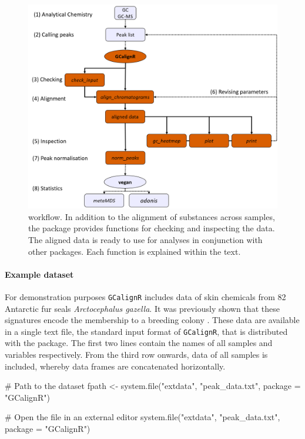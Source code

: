 \begin{figure}[htbp]
  \centering
  \includegraphics[width=13cm]{figures/workflow}
  \caption{ workflow. In addition to the alignment of substances across samples, the package provides functions for checking and inspecting the data. The aligned data is ready to use for analyses in conjunction with other packages. Each function is explained within the text.}
  \label{figure:workflow}
\end{figure}

\paragraph{Example dataset}\label{example-dataset}

For demonstration purposes \texttt{GCalignR} includes data of skin
chemicals from 82 Antarctic fur seals \textit{Arctocephalus gazella}. It
was previously shown that these signatures encode the membership to a
breeding colony \cite{Stoffel.2015}. These data are available in a
single text file, the standard input format of \texttt{GCalignR}, that
is distributed with the package. The first two lines contain the names
of all samples and variables respectively. From the third row onwards,
data of all samples is included, whereby data frames are concatenated
horizontally.

\begin{Schunk}
\begin{Sinput}
# Path to the dataset
fpath <- system.file("extdata", "peak_data.txt", package = "GCalignR")
\end{Sinput}
\end{Schunk}\begin{Schunk}
\begin{Sinput}
# Open the file in an external editor
system.file("extdata", "peak_data.txt", package = "GCalignR")
\end{Sinput}
\end{Schunk}

